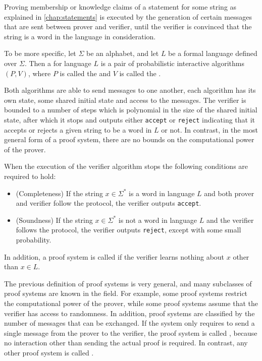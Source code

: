 Proving membership or knowledge claims of a statement for some string as explained in \chaptname{} \ref{chap:statements} is executed by the generation of certain messages that are sent between prover and verifier, until the verifier is convinced that the string is a word in the language in consideration.

To be more specific, let $\Sigma$ be an alphabet, and let $L$ be a formal language defined over $\Sigma$. Then a  for language $L$ is a pair of probabilistic interactive algorithms $(P,V)$, where $P$ is called the  and $V$ is called the . 

Both algorithms are able to send messages to one another, each algorithm has its own state, some shared initial state and access to the messages. The verifier is bounded to a number of steps which is polynomial in the size of the shared initial state, after which it stops and outputs either \texttt{accept} or \texttt{reject} indicating that it accepts or rejects a given string to be a word in $L$ or not. In contrast, in the most general form of a proof system, there are no bounds on the computational power of the prover.

When the execution of the verifier algorithm stops the following conditions are required to hold:
\begin{itemize}
\item (Completeness) If the string $x\in \Sigma^*$ is a word in language $L$ and both prover and verifier follow the protocol, the verifier outputs \texttt{accept}.
\item (Soundness) If the string $x\in \Sigma^*$ is not a word in language $L$ and the verifier follows the protocol, the verifier outputs \texttt{reject}, except with some small probability.
\end{itemize}
In addition, a proof system is called  if the verifier learns nothing about $x$ other than $x\in L$. 

The previous definition of proof systems is very general, and many subclasses of proof systems are known in the field. For example, some proof systems restrict the computational power of the prover, while some proof systems assume that the verifier has access to randomness. In addition, proof systems are classified by the number of messages that can be exchanged. If the system only requires to send a single message from the prover to the verifier, the proof system is called , because no interaction other than sending the actual proof is required. In contrast, any other proof system is called .

